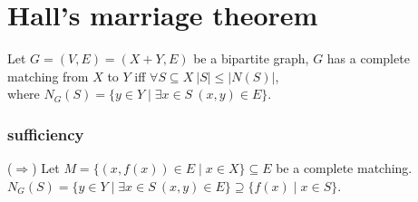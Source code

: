 \documentclass{article}
\begin{document}
\tableofcontents

\newpage
\section{Hall's marriage theorem}
Let $G=(V,E)=(X+Y,E)$ be a bipartite graph, $G$ has a complete matching from $X$ to $Y$ iff $\forall S\subseteq X\ |S|\leq |N(S)|$,\\
where $N_G(S)=\{y\in Y\mid \exists x\in S\ (x,y)\in E\}$.



\subsubsection{sufficiency}
($\Rightarrow$)\quad
Let $M=\{(x,f(x))\in E\mid x\in X\}\subseteq E$ be a complete matching.\\
$N_G(S)=\{y\in Y\mid \exists x\in S\ (x,y)\in E\}\supseteq \{f(x)\mid x\in S\}$.
\end{document}
